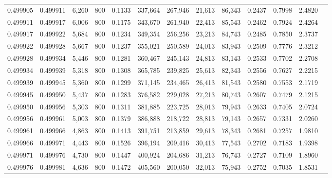 \begin{tabular}{rrrrrrrrrrrrr}
0.499905 & 0.499911 &  6,260 &   800 &                                     0.1133 & 337,664 & 267,946 &  21,613 &  86,343 & 0.2437 & 0.7998 & 2.4820 \\
0.499911 & 0.499917 &  6,006 &   800 &                                     0.1175 & 343,670 & 261,940 &  22,413 &  85,543 & 0.2462 & 0.7924 & 2.4264 \\
0.499917 & 0.499922 &  5,684 &   800 &                                     0.1234 & 349,354 & 256,256 &  23,213 &  84,743 & 0.2485 & 0.7850 & 2.3737 \\
0.499922 & 0.499928 &  5,667 &   800 &                                     0.1237 & 355,021 & 250,589 &  24,013 &  83,943 & 0.2509 & 0.7776 & 2.3212 \\
0.499928 & 0.499934 &  5,446 &   800 &                                     0.1281 & 360,467 & 245,143 &  24,813 &  83,143 & 0.2533 & 0.7702 & 2.2708 \\
0.499934 & 0.499939 &  5,318 &   800 &                                     0.1308 & 365,785 & 239,825 &  25,613 &  82,343 & 0.2556 & 0.7627 & 2.2215 \\
0.499939 & 0.499945 &  5,360 &   800 &                                     0.1299 & 371,145 & 234,465 &  26,413 &  81,543 & 0.2580 & 0.7553 & 2.1719 \\
0.499945 & 0.499950 &  5,437 &   800 &                                     0.1283 & 376,582 & 229,028 &  27,213 &  80,743 & 0.2607 & 0.7479 & 2.1215 \\
0.499950 & 0.499956 &  5,303 &   800 &                                     0.1311 & 381,885 & 223,725 &  28,013 &  79,943 & 0.2633 & 0.7405 & 2.0724 \\
0.499956 & 0.499961 &  5,003 &   800 &                                     0.1379 & 386,888 & 218,722 &  28,813 &  79,143 & 0.2657 & 0.7331 & 2.0260 \\
0.499961 & 0.499966 &  4,863 &   800 &                                     0.1413 & 391,751 & 213,859 &  29,613 &  78,343 & 0.2681 & 0.7257 & 1.9810 \\
0.499966 & 0.499971 &  4,443 &   800 &                                     0.1526 & 396,194 & 209,416 &  30,413 &  77,543 & 0.2702 & 0.7183 & 1.9398 \\
0.499971 & 0.499976 &  4,730 &   800 &                                     0.1447 & 400,924 & 204,686 &  31,213 &  76,743 & 0.2727 & 0.7109 & 1.8960 \\
0.499976 & 0.499981 &  4,636 &   800 &                                     0.1472 & 405,560 & 200,050 &  32,013 &  75,943 & 0.2752 & 0.7035 & 1.8531 \\

\end{tabular}
